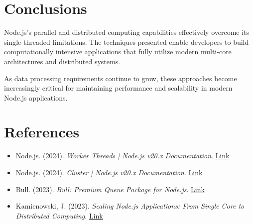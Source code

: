 \documentclass[12pt,letterpaper]{article}
\begin{document}
\section{Conclusions}

Node.js's parallel and distributed computing capabilities effectively overcome its single-threaded limitations. The techniques presented enable developers to build computationally intensive applications that fully utilize modern multi-core architectures and distributed systems.

As data processing requirements continue to grow, these approaches become increasingly critical for maintaining performance and scalability in modern Node.js applications.

\section{References}

\begin{itemize}
    \item Node.js. (2024). \textit{Worker Threads | Node.js v20.x Documentation}. \href{https://nodejs.org/docs/latest-v20.x/api/worker_threads.html}{Link}
    
    \item Node.js. (2024). \textit{Cluster | Node.js v20.x Documentation}. \href{https://nodejs.org/docs/latest-v20.x/api/cluster.html}{Link}
    
    \item Bull. (2023). \textit{Bull: Premium Queue Package for Node.js}. \href{https://github.com/OptimalBits/bull}{Link}
    
    \item Kamienowski, J. (2023). \textit{Scaling Node.js Applications: From Single Core to Distributed Computing}. \href{https://blog.appsignal.com/2023/04/19/scaling-nodejs-applications.html}{Link}
\end{itemize}
\end{document}
